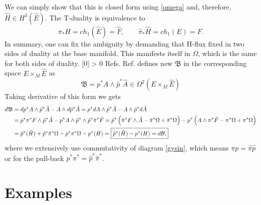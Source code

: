 \documentclass[a4paper]{article}
\renewcommand{\cite}[1]{%
\begingroup
\def\tempx{0}%
  \StrCount{#1}{,}[\tempx]%
  \ifnum\tempx > 0 
  Refs. %
  \else
  Ref. %
  \fi
\endgroup
\origcite{#1}%
}
\begin{document}
We can simply show that this is closed form using \eqref{omega} and, therefore, $\hat{H} \in H^3(\hat{E})$. The T-duality is equivalence to
\begin{equation} \label{tsuality}
\pi_* H = ch_1(\hat{E})=\hat{F}, \qquad \hat{\pi}_* \hat{H} = ch_1({E})={F}.
\end{equation}
In summary, one can fix the ambiguity by demanding that H-flux fixed in two sides of duality at the base manifold. This manifests itself in $\Omega$, which is the same for both sides of duality. \cite{mathai} defines new $\mathfrak{B}$ in the corresponding space $E \times_M \hat{E}$ as
\begin{equation}
\mathfrak{B} = p^* A \wedge \hat{p}^* \hat{A} \in \Omega^2(E \times_M \hat{E})
\end{equation}
Taking derivative of this form we gets
\begin{align} \nonumber
d \mathfrak{B} &= d p^*A \wedge \hat{p}^* \hat{A}  - A \wedge d\hat{p}^* \hat{A} = p^* dA \wedge \hat{p}^* \hat{A}  - A \wedge \hat{p}^* d \hat{A} 
\\ \nonumber
&= p^* \pi^* F \wedge \hat{p}^* \hat{A} - p^* A \wedge \hat{p}^* \wedge \hat{p}^* \hat{\pi}^*\hat{F}=\hat{p}^*\left(\hat{\pi}^* F \wedge \hat{A} - \hat{\pi}^* \Omega + \hat{\pi}^* \Omega \right) - {p}^*\left({A} \wedge{ \pi}^* \hat{F}  - {\pi}^* \Omega + {\pi}^* \Omega \right)
\\
&= \hat{p}^* (\hat{H})+ \hat{p}^* \hat{\pi}^* \Omega - p^* \pi^* \Omega - p^*(H) =
\begin{boxed}
{
 \hat{p}^* (\hat{H})- p^*(H)=d\mathcal{B},
}
\end{boxed}
\end{align}
where we extensively use commutativity of diagram \eqref{gysin}, which means $\pi p = \hat{\pi} \hat{p}$ or for the pull-back $p^* \pi^*  = \hat{p}^* \hat{\pi}^*$.
\section{Examples}
\end{document}
